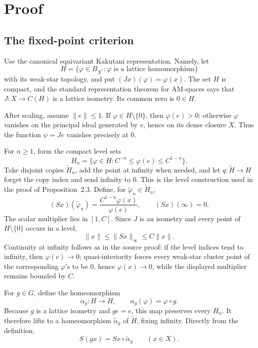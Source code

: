 \documentclass[10pt]{article}
\begin{document}
\section{Proof}

\subsection*{The fixed-point criterion}

Use the canonical equivariant Kakutani representation. Namely, let
\[
 H=\{\varphi\in B_{X^*}:\varphi\text{ is a lattice homomorphism}\}
\]
with its weak-star topology, and put $(Jx)(\varphi)=\varphi(x)$. The set $H$
is compact, and the standard representation theorem for AM-spaces says that
$J:X\to C(H)$ is a lattice isometry. Its common zero is $0\in H$.

After scaling, assume $\|e\|\leq1$. If $\varphi\in H\setminus\{0\}$, then
$\varphi(e)>0$: otherwise $\varphi$ vanishes on the principal ideal generated
by $e$, hence on its dense closure $X$. Thus the function
$\psi=Je$ vanishes precisely at $0$.

For $n\geq1$, form the compact level sets
\[
 H_n=\{\varphi\in H:C^{-n}\leq\varphi(e)\leq C^{1-n}\}.
\]
Take disjoint copies $\widetilde H_n$, add the point at infinity when needed,
and let $q:\widetilde H\to H$ forget the copy index and send infinity to
$0$. This is the level construction used in the proof of Proposition~2.3.
Define, for $\widetilde\varphi_n\in\widetilde H_n$,
\[
 (Sx)(\widetilde\varphi_n)
   =\frac{C^{1-n}\varphi(x)}{\varphi(e)},
 \qquad (Sx)(\infty)=0.
\]
The scalar multiplier lies in $[1,C]$. Since $J$ is an isometry and every
point of $H\setminus\{0\}$ occurs in a level,
\[
 \|x\|\leq\|Sx\|_\infty\leq C\|x\|.
\]
Continuity at infinity follows as in the source proof: if the level indices
tend to infinity, then $\varphi(e)\to0$; quasi-interiority forces every
weak-star cluster point of the corresponding $\varphi$'s to be $0$, hence
$\varphi(x)\to0$, while the displayed multiplier remains bounded by $C$.

For $g\in G$, define the homeomorphism
\[
 \alpha_g:H\to H,\qquad \alpha_g(\varphi)=\varphi\circ g.
\]
Because $g$ is a lattice isometry and $ge=e$, this map preserves every
$H_n$. It therefore lifts to a homeomorphism $\widetilde\alpha_g$ of
$\widetilde H$, fixing infinity. Directly from the definition,
\begin{equation}\label{eq:equivariance}
 S(gx)=Sx\circ\widetilde\alpha_g \qquad (x\in X).
\end{equation}
\end{document}
